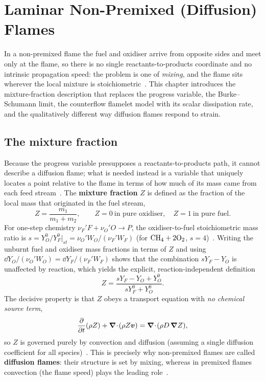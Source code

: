 \chapter{Laminar Non-Premixed (Diffusion) Flames}\label{ch:nonpremixed}

In a non-premixed flame the fuel and oxidiser arrive from opposite sides and meet only at the flame, so there is no single reactants-to-products coordinate and no intrinsic propagation speed: the problem is one of \emph{mixing}, and the flame sits wherever the local mixture is stoichiometric~\cite{lecture9,transcript_l9}. This chapter introduces the mixture-fraction description that replaces the progress variable, the Burke--Schumann limit, the counterflow flamelet model with its scalar dissipation rate, and the qualitatively different way diffusion flames respond to strain.

\section{The mixture fraction}

Because the progress variable presupposes a reactants-to-products path, it cannot describe a diffusion flame; what is needed instead is a variable that uniquely locates a point relative to the flame in terms of how much of its mass came from each feed stream~\cite{lecture9,transcript_l9}. The \textbf{mixture fraction} $Z$ is defined as the fraction of the local mass that originated in the fuel stream,
\begin{equation}
Z=\frac{m_1}{m_1+m_2},\qquad Z=0\ \text{in pure oxidiser},\quad Z=1\ \text{in pure fuel}.
\label{eq:Zdef}
\end{equation}
For one-step chemistry $\nu_F' F+\nu_O' O\rightarrow P$, the oxidiser-to-fuel stoichiometric mass ratio is $s=Y_O^0/Y_F^0\big|_{st}=\nu_O' W_O/(\nu_F' W_F)$ (for $\mathrm{CH_4}+2\mathrm{O_2}$, $s=4$)~\cite{lecture9}. Writing the unburnt fuel and oxidiser mass fractions in terms of $Z$ and using $\dd Y_O/(\nu_O' W_O)=\dd Y_F/(\nu_F' W_F)$ shows that the combination $sY_F-Y_O$ is unaffected by reaction, which yields the explicit, reaction-independent definition
\begin{equation}
Z=\frac{sY_F-Y_O+Y_O^0}{sY_F^0+Y_O^0}.
\label{eq:Z-twostream}
\end{equation}
The decisive property is that $Z$ obeys a transport equation with \emph{no chemical source term},
\begin{equation}
\frac{\partial }{\partial t}(\rho Z)+\boldsymbol{\nabla}\!\cdot\!(\rho Z\boldsymbol{v})=\boldsymbol{\nabla}\!\cdot\!(\rho D\,\boldsymbol{\nabla} Z),
\label{eq:Z-transport}
\end{equation}
so $Z$ is governed purely by convection and diffusion (assuming a single diffusion coefficient for all species)~\cite{lecture9}. This is precisely why non-premixed flames are called \textbf{diffusion flames}: their structure is set by mixing, whereas in premixed flames convection (the flame speed) plays the leading role~\cite{transcript_l9}.

